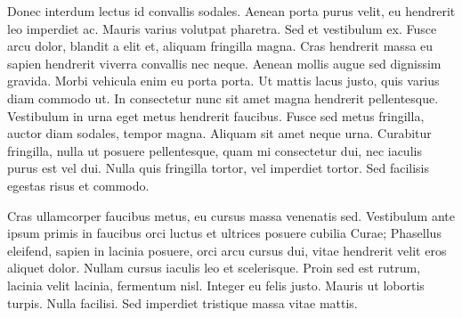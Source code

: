 Donec interdum lectus id convallis sodales. Aenean porta purus velit, eu hendrerit leo imperdiet ac. Mauris varius volutpat pharetra. Sed et vestibulum ex. Fusce arcu dolor, blandit a elit et, aliquam fringilla magna. Cras hendrerit massa eu sapien hendrerit viverra convallis nec neque. Aenean mollis augue sed dignissim gravida. Morbi vehicula enim eu porta porta. Ut mattis lacus justo, quis varius diam commodo ut. In consectetur nunc sit amet magna hendrerit pellentesque. Vestibulum in urna eget metus hendrerit faucibus. Fusce sed metus fringilla, auctor diam sodales, tempor magna. Aliquam sit amet neque urna. Curabitur fringilla, nulla ut posuere pellentesque, quam mi consectetur dui, nec iaculis purus est vel dui. Nulla quis fringilla tortor, vel imperdiet tortor. Sed facilisis egestas risus et commodo.

Cras ullamcorper faucibus metus, eu cursus massa venenatis sed. Vestibulum ante ipsum primis in faucibus orci luctus et ultrices posuere cubilia Curae; Phasellus eleifend, sapien in lacinia posuere, orci arcu cursus dui, vitae hendrerit velit eros aliquet dolor. Nullam cursus iaculis leo et scelerisque. Proin sed est rutrum, lacinia velit lacinia, fermentum nisl. Integer eu felis justo. Mauris ut lobortis turpis. Nulla facilisi. Sed imperdiet tristique massa vitae mattis.
